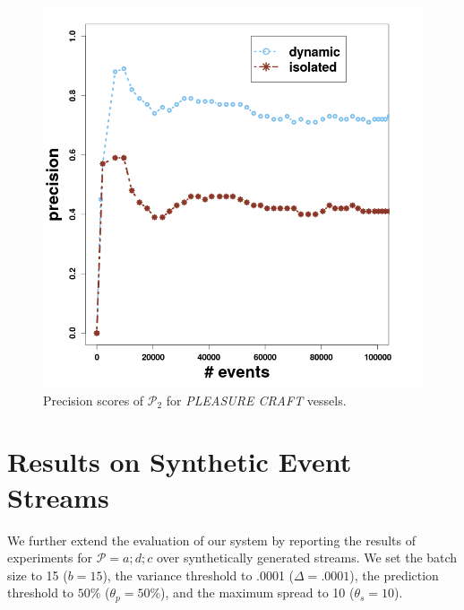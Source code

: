 \begin{figure}[H]
	\centering
	\includegraphics[width=\textwidth,height=.55\textheight]{chapters/figures/synopses/p2_precision_100_2_08.png}
	
	\caption{Precision scores of $\mathcal{P}_2$  for \textit{PLEASURE CRAFT} vessels.}
	\label{fig:precsions_p2}
\end{figure}

\section{Results on Synthetic Event Streams}
\label{sec:results_synthetic}

We further extend the evaluation of our system by reporting the results of experiments for $\mathcal{P}=a ; d ; c$ over synthetically generated streams. We set the batch size to 15 ($b=15$), the variance threshold to .0001 ($\Delta=.0001$), the  \pmcmr prediction threshold to $50\%$ ($\theta_{p}=50\%$), and the maximum spread to 10 ($\theta_{s}=10$).

